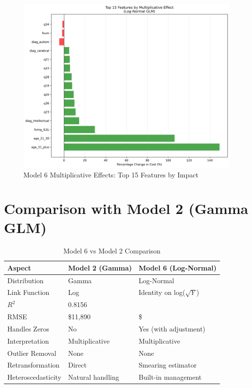 \begin{figure}[h]
    \centering
    \includegraphics[width=\textwidth]{models/model_6/multiplicative_effects.png}
    \caption{Model 6 Multiplicative Effects: Top 15 Features by Impact}
    \label{fig:model6_effects}
\end{figure}

\section{Comparison with Model 2 (Gamma GLM)}

\begin{table}[h]
\centering
\caption{Model 6 vs Model 2 Comparison}
\begin{tabular}{lll}
\toprule
\textbf{Aspect} & \textbf{Model 2 (Gamma)} & \textbf{Model 6 (Log-Normal)} \\
\midrule
Distribution & Gamma & Log-Normal \\
Link Function & Log & Identity on log($\sqrt{Y}$) \\
$R^2$ & 0.8156 & \ModelSixRSquaredTest{} \\
RMSE & \$11,890 & \$\ModelSixRMSETest{} \\
Handles Zeros & No & Yes (with adjustment) \\
Interpretation & Multiplicative & Multiplicative \\
Outlier Removal & None & None \\
Retransformation & Direct & Smearing estimator \\
Heteroscedasticity & Natural handling & Built-in management \\
\bottomrule
\end{tabular}
\end{table}

